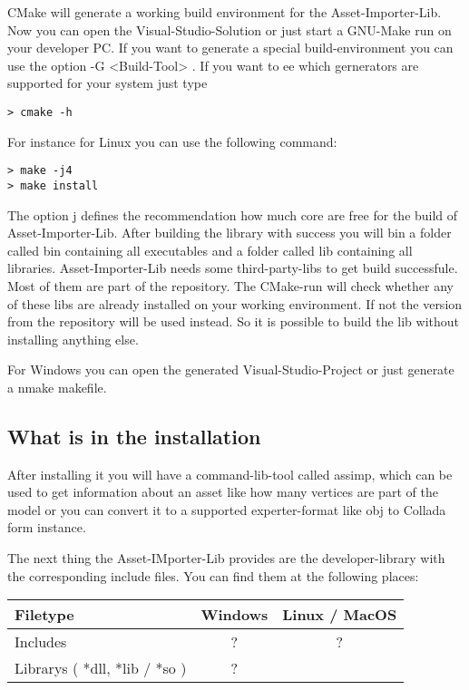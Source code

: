 CMake will generate a working build environment for the Asset-Importer-Lib. Now you can open the Visual-Studio-Solution or just start a GNU-Make run on your developer PC. 
If you want to generate a special build-environment you can use the option -G <Build-Tool> . If you want to ee which gernerators are supported for your system just type 
\begin{lstlisting}[label=some-code,caption=Run the build on Linux using 4 cores]
> cmake -h
\end{lstlisting}

For instance for Linux you can use the following command:
\begin{lstlisting}[label=some-code,caption=Run the build on Linux using 4 cores]
> make -j4
> make install
\end{lstlisting}

The option j defines the recommendation how much core are free for the build of Asset-Importer-Lib.
After building the library with success you will bin a folder called bin containing all executables and a folder called lib containing all libraries. Asset-Importer-Lib needs
some third-party-libs to get build successfule. Most of them are part of the repository. The CMake-run will check whether any of these libs are already installed on your working 
environment. If not the version from the repository will be used instead. So it is possible to build the lib without installing anything else.
\par
For Windows you can open the generated Visual-Studio-Project or just generate a nmake makefile.
\subsection{What is in the installation}
After installing it you will have a command-lib-tool called assimp, which can be used to get information about an asset like how many vertices are part of the model or you 
can convert it to a supported experter-format like obj to Collada form instance.
\par
The next thing the Asset-IMporter-Lib provides are the developer-library with the corresponding include files. You can find them at the following places:
\begin{center}
\begin{tabular}{ | l | c | c | }
\hline
Filetype & Windows & Linux / MacOS \\
\hline
Includes                       & ?       & ?             \\
\hline
Librarys ( *dll, *lib / *so )  & ?       &               \\
\hline

\end{tabular}
\end{center}


